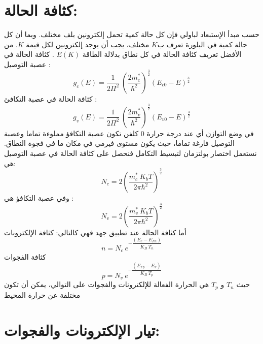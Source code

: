 \section{كثافة الحالة:}
	حسب مبدأ الإستبعاد لباولي فإن كل حالة كمية تحمل إلكترونين بلف مختلف. وبما أن كل حالة كمية في البلورة تعرف ب$ K $ مختلف، يجب أن يوجد إلكترونين لكل قيمة $ K $. 
	من الأفضل تعريف كثافة الحالة في كل نطاق بدلالة الطاقة $ E(K) $ .
	كثافة الحالة في عصبة التوصيل : 
	\begin{equation}
		g_c\left( E \right) = \frac{1}{2 \Pi^{2}}\ \left( \dfrac{2m^{*}_c}{\hbar^{2}} \right)^{\frac{3}{2}}\left(  E_{c0} - E \right)^{\frac{3}{2}}   
	\end{equation}
	كثافة الحالة في عصبة التكافئ : 
	\begin{equation}
		g_v\left( E \right) = \frac{1}{2 \Pi^{2}}\ \left( \dfrac{2m^{*}_v}{\hbar^{2}} \right)^{\frac{3}{2}}\left(  E_{v0} - E \right)^{\frac{3}{2}}   
	\end{equation}
	في وضع التوازن أي عند درجة حرارة 0 كلفن تكون عصبة التكافؤ مملوءة تماما وعصبة التوصيل فارغة تماما، حيث يكون مستوى فيرمي في مكان ما في فجوة النطاق. نستعمل اختصار بولتزمان لتبسيط التكامل فنحصل على كثافة الحالة في عصبة التوصيل هي: 
	\begin{equation}
		N_c = 2 \left( \dfrac{m^{*}_c\ K_b T}{2 \pi \hbar^{2}} \right) ^{\frac{3}{2}}
	\end{equation}
	وفي عصبة التكافؤ هي :
	\begin{equation}
		N_v = 2 \left( \dfrac{m^{*}_v\ K_b T}{2 \pi \hbar^{2}} \right) ^{\frac{3}{2}}
	\end{equation}
	أما كثافة الحالة عند تطبيق جهد فهي كالتالي:
	كثافة الإلكترونات 
	\begin{equation}
		n= N_c\ e^{-\dfrac{\left( E_c-E_{Fn} \right) }{K_B\ T_n}}
	\end{equation}
	كثافة الفجوات
	\begin{equation}
		p= N_v\ e^{-\dfrac{\left( E_{Fp}-E_v \right) }{K_B\ T_p}}
	\end{equation}
	حيث $ T_n $ و $ T_p  $ هي الحرارة الفعالة للإلكترونات والفجوات على التوالي، يمكن أن تكون مختلفة عن حرارة المحيط
	
\section{ تيار الإلكترونات والفجوات:}
	
